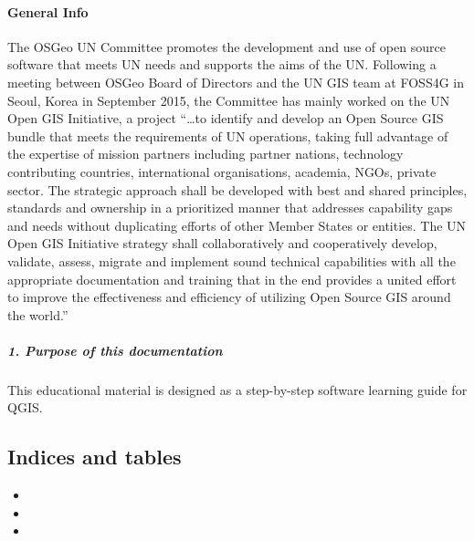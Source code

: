 \documentclass[letterpaper,10pt,english]{sphinxmanual}
\begin{document}
\paragraph{General Info}
\label{\detokenize{introduction/general:general-info}}\label{\detokenize{introduction/general::doc}}
The OSGeo UN Committee promotes the development and use of open source software that meets UN needs and supports the aims of the UN. Following a meeting between OSGeo Board of Directors and the UN GIS team at FOSS4G in Seoul, Korea in September 2015, the Committee has mainly worked on the UN Open GIS Initiative, a project “…to identify and develop an Open Source GIS bundle that meets the requirements of UN operations, taking full advantage of the expertise of mission partners including partner nations, technology contributing countries, international organisations, academia, NGOs, private sector. The strategic approach shall be developed with best and shared principles, standards and ownership in a prioritized manner that addresses capability gaps and needs without duplicating efforts of other Member States or entities. The UN Open GIS Initiative strategy shall collaboratively and cooperatively develop, validate, assess, migrate and implement sound technical capabilities with all the appropriate documentation and training that in the end provides a united effort to improve the effectiveness and efficiency of utilizing Open Source GIS around the world.”


\subparagraph{1. Purpose of this documentation}
\label{\detokenize{introduction/general:purpose-of-this-documentation}}
This educational material is designed as a step-by-step software learning guide for QGIS.


\subsection{Indices and tables}
\label{\detokenize{index:indices-and-tables}}\begin{itemize}
\item {} 

\item {} 

\item {} 

\end{itemize}



\renewcommand{\indexname}{Index}
\printindex
\end{document}
